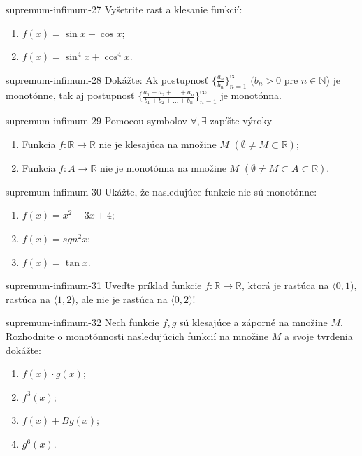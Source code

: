 \begin{defproblem}{supremum-infimum-27}
Vyšetrite rast a klesanie funkcií:
\begin{enumerate}
\item $f(x)=\sin x +\cos x$;
\item $f(x)=\sin^4 x +\cos^4 x$.
\end{enumerate}
\end{defproblem}

\begin{defproblem}{supremum-infimum-28}
Dokážte: Ak postupnosť $\{\frac{a_n}{b_n}\}_{n=1}^\infty$ $(b_n>0$ pre $n\in\mathbb{N}$) je monotónne, tak aj postupnosť $\{\frac{a_1+a_2+...+a_n}{b_1+b_2+...+b_n}\}_{n=1}^\infty$ je monotónna.
\end{defproblem}

\begin{defproblem}{supremum-infimum-29}
Pomocou symbolov $\forall,\exists$ zapíšte výroky
\begin{enumerate}
\item Funkcia $f:\mathbb{R}\rightarrow\mathbb{R}$ nie je klesajúca na množine $M$ $(\emptyset \neq M\subset\mathbb{R})$;
\item Funkcia $f:A \rightarrow\mathbb{R}$ nie je monotónna na množine $M$ $(\emptyset \neq M\subset A \subset\mathbb{R})$.
\end{enumerate}
\end{defproblem}

\begin{defproblem}{supremum-infimum-30}
Ukážte, že nasledujúce funkcie nie sú monotónne:
\begin{enumerate}
\item $f(x)=x^2-3x+4$;
\item $f(x)=sgn^2 x$;
\item $f(x)=\tan x$.
\end{enumerate}
\end{defproblem}

\begin{defproblem}{supremum-infimum-31}
Uveďte príklad funkcie $f:\mathbb{R}\rightarrow\mathbb{R}$, ktorá je rastúca na $\langle 0,1)$, rastúca na $\langle 1,2)$, ale nie je rastúca na $\langle 0,2)$!
\end{defproblem}

\begin{defproblem}{supremum-infimum-32}
Nech funkcie $f,g$ sú klesajúce a záporné na množine $M$. Rozhodnite o monotónnosti nasledujúcich funkcií na množine $M$ a svoje tvrdenia dokážte:
\begin{multicols}{2}
\begin{enumerate}
    \item $f(x)\cdot g(x)$;
    \item $f^3(x)$;
    \item $f(x)+Bg(x)$;
    \item $g^6(x)$.
\end{enumerate}
\end{multicols}
\end{defproblem}

